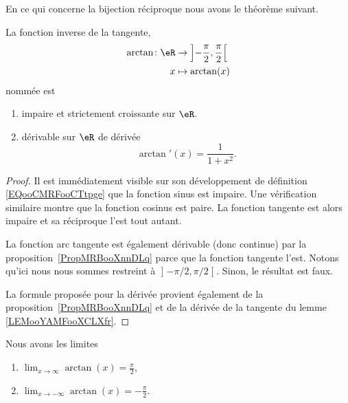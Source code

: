 En ce qui concerne la bijection réciproque nous avons le théorème suivant.
\begin{theorem}     \label{THOooUSVGooOAnCvC}
	La fonction inverse de la tangente,
	\begin{equation}
		\begin{aligned}
			\arctan\colon \eR & \to \left] -\frac{ \pi }{2} , \frac{ \pi }{2} \right[ \\
			x                 & \mapsto \arctan(x)
		\end{aligned}
	\end{equation}
	nommée  est
	\begin{enumerate}
		\item
		      impaire et strictement croissante sur \( \eR\).
		\item       \label{ITEMooMNHLooOVhIIb}
		      dérivable sur \( \eR\) de dérivée
		      \begin{equation}        \label{EQooGCHGooPlwYWt}
			      \arctan'(x)=\frac{1}{ 1+x^2 }.
		      \end{equation}
	\end{enumerate}
\end{theorem}

\begin{proof}
	Il est immédiatement visible sur son développement de définition \eqref{EQooCMRFooCTtpge} que la fonction sinus est impaire. Une vérification similaire montre que la fonction cosinus est paire. La fonction tangente est alors impaire et sa réciproque l'est tout autant.

	La fonction arc tangente est également dérivable (donc continue) par la proposition~\ref{PropMRBooXnnDLq} parce que la fonction tangente l'est. Notons qu'ici nous nous sommes restreint à \( \mathopen] -\pi/2 , \pi/2 \mathclose[\). Sinon, le résultat est faux.

	La formule proposée pour la dérivée provient également de la proposition~\ref{PropMRBooXnnDLq} et de la dérivée de la tangente du lemme \ref{LEMooYAMFooXCLXfr}.
\end{proof}

\begin{lemma}       \label{LEMooHRDCooGtnyeQ}
	Nous avons les limites
	\begin{enumerate}
		\item
		      \( \lim_{x\to \infty} \arctan(x)=\frac{ \pi }{2}\),
		\item
		      \( \lim_{x\to -\infty} \arctan(x)=-\frac{ \pi }{2}\).
	\end{enumerate}
\end{lemma}

